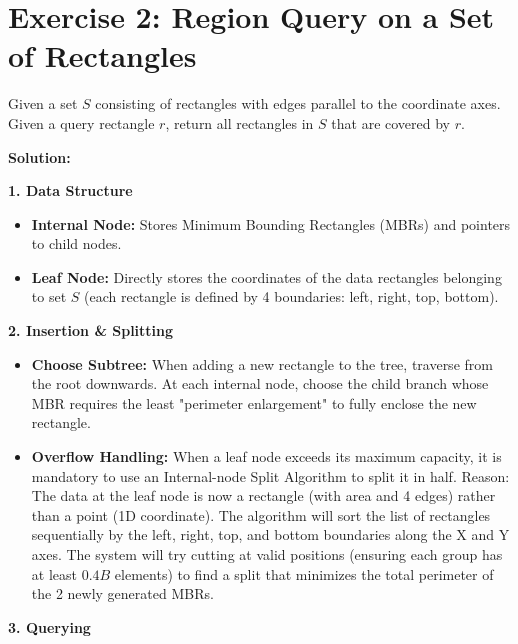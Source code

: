 \documentclass[a4paper, 10pt, titlepage]{report}
\begin{document}
\section{Exercise 2: Region Query on a Set of Rectangles}
Given a set $S$ consisting of rectangles with edges parallel to the coordinate axes. Given a query rectangle $r$, return all rectangles in $S$ that are covered by $r$.

\textbf{Solution:}

\textbf{1. Data Structure}
\begin{itemize}
    \item \textbf{Internal Node:} Stores Minimum Bounding Rectangles (MBRs) and pointers to child nodes.
    \item \textbf{Leaf Node:} Directly stores the coordinates of the data rectangles belonging to set $S$ (each rectangle is defined by 4 boundaries: left, right, top, bottom).
\end{itemize}

\textbf{2. Insertion \& Splitting}
\begin{itemize}
    \item \textbf{Choose Subtree:} When adding a new rectangle to the tree, traverse from the root downwards. At each internal node, choose the child branch whose MBR requires the least "perimeter enlargement" to fully enclose the new rectangle.
    \item \textbf{Overflow Handling:} When a leaf node exceeds its maximum capacity, it is mandatory to use an Internal-node Split Algorithm to split it in half. Reason: The data at the leaf node is now a rectangle (with area and 4 edges) rather than a point (1D coordinate). The algorithm will sort the list of rectangles sequentially by the left, right, top, and bottom boundaries along the X and Y axes. The system will try cutting at valid positions (ensuring each group has at least $0.4B$ elements) to find a split that minimizes the total perimeter of the 2 newly generated MBRs.
\end{itemize}

\textbf{3. Querying}
\end{document}
